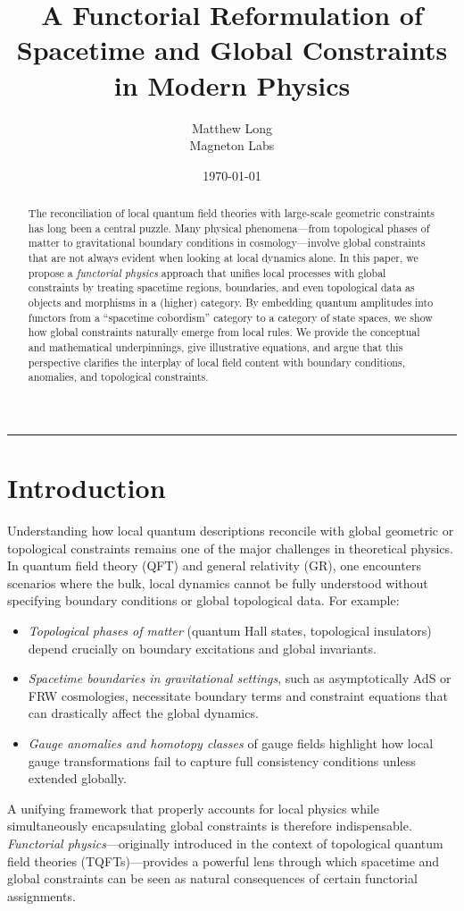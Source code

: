 \documentclass[12pt]{article}
\title{\bf A Functorial Reformulation of Spacetime and Global Constraints \\
\large in Modern Physics}
\author{Matthew Long \\
Magneton Labs}
\date{\today}
\begin{document}
\maketitle

\begin{abstract}
The reconciliation of local quantum field theories with large-scale geometric constraints
has long been a central puzzle. Many physical phenomena---from topological phases of matter
to gravitational boundary conditions in cosmology---involve global constraints that are not
always evident when looking at local dynamics alone. In this paper, we propose a \emph{functorial
physics} approach that unifies local processes with global constraints by treating spacetime regions,
boundaries, and even topological data as objects and morphisms in a (higher) category. By embedding
quantum amplitudes into functors from a ``spacetime cobordism'' category to a category of state spaces,
we show how global constraints naturally emerge from local rules. We provide the conceptual and
mathematical underpinnings, give illustrative equations, and argue that this perspective clarifies
the interplay of local field content with boundary conditions, anomalies, and topological constraints.
\end{abstract}

\hrule
\vspace{1em}

\section{Introduction}
Understanding how local quantum descriptions reconcile with global geometric or topological constraints
remains one of the major challenges in theoretical physics. In quantum field theory (QFT) and general
relativity (GR), one encounters scenarios where the bulk, local dynamics cannot be fully understood
without specifying boundary conditions or global topological data. For example:
\begin{itemize}[label=$\bullet$]
\item \emph{Topological phases of matter} (quantum Hall states, topological insulators) depend crucially
on boundary excitations and global invariants.
\item \emph{Spacetime boundaries in gravitational settings}, such as asymptotically AdS or FRW cosmologies,
necessitate boundary terms and constraint equations that can drastically affect the global dynamics.
\item \emph{Gauge anomalies and homotopy classes} of gauge fields highlight how local gauge transformations
fail to capture full consistency conditions unless extended globally.
\end{itemize}
A unifying framework that properly accounts for local physics while simultaneously encapsulating global constraints
is therefore indispensable. \emph{Functorial physics}---originally introduced in the context of topological quantum field theories
(TQFTs)---provides a powerful lens through which spacetime and global constraints can be seen as natural consequences
of certain functorial assignments.
\end{document}
